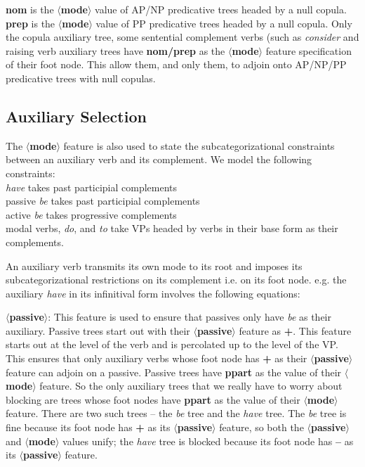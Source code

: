 \noindent
{\bf nom} is the {\bf $\langle$mode$\rangle$} value of AP/NP
predicative trees headed by a null copula.  {\bf prep} is the {\bf
$\langle$mode$\rangle$} value of PP predicative trees headed by a null
copula.  Only the copula auxiliary tree, some sentential complement
verbs (such as {\it consider} and raising verb auxiliary trees have
{\bf nom/prep} as the {\bf $\langle$mode$\rangle$} feature
specification of their foot node. This allow them, and only them, to
adjoin onto AP/NP/PP predicative trees with null copulas.

\subsection{Auxiliary Selection}
The {\bf $\langle$mode$\rangle$} feature is also used to state the
subcategorizational constraints between an auxiliary verb and its
complement. We model the following constraints:\\
{\em have} takes past participial complements\\
passive {\em be} takes past participial complements\\
active {\em be} takes progressive complements\\
modal verbs, {\em do}, and {\em to} take VPs headed by verbs in their
base form as their complements. 

An auxiliary verb transmits its own mode to its root and imposes its
subcategorizational restrictions on its complement i.e. on its foot node.
e.g. the auxiliary {\em have} in its infinitival form involves the
following equations:


\noindent
{\bf $\langle$passive$\rangle$}: This feature is used to ensure that
passives only have {\em be} as their auxiliary. Passive trees start
out with their {\bf $\langle$passive$\rangle$} feature as {\bf +}.
This feature starts out at the level of the verb and is percolated up
to the level of the VP. This ensures that only auxiliary verbs whose
foot node has {\bf +} as their {\bf $\langle$passive$\rangle$} feature
can adjoin on a passive. Passive trees have {\bf ppart} as the value
of their {\bf $\langle$mode$\rangle$} feature. So the only auxiliary
trees that we really have to worry about blocking are trees whose foot
nodes have {\bf ppart} as the value of their {\bf
$\langle$mode$\rangle$} feature. There are two such trees -- the {\em
be} tree and the {\em have} tree. The {\em be} tree is fine because
its foot node has {\bf +} as its {\bf $\langle$passive$\rangle$}
feature, so both the {\bf $\langle$passive$\rangle$} and {\bf
$\langle$mode$\rangle$} values unify; the {\em have} tree is blocked
because its foot node has {\bf --} as its {\bf
$\langle$passive$\rangle$} feature.

